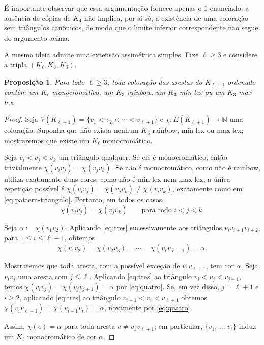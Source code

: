 \documentclass[reqno, 12pt]{amsart}
\numberwithin{equation}{section}
\theoremstyle{plain}
\newtheorem{proposition}[theorem]{Proposição}
\theoremstyle{definition}
\begin{document}
É importante observar que essa argumentação fornece apenas o
$1$-enunciado: a ausência de cópias de $K_4$ não implica, por si
só, a existência de uma coloração sem triângulos canônicos, de
modo que o limite inferior correspondente não segue do argumento
acima.

\medskip

A mesma ideia admite uma extensão assimétrica simples. Fixe
$\ell\geq3$ e considere a tripla $(K_\ell,K_3,K_3)$.

\begin{proposition}
  \label{prop:l33-complete}
  Para todo $\ell\geq3$, toda coloração das arestas do
  $K_{\ell+1}$ ordenado contém um $K_\ell$ monocromático, um
  $K_3$ rainbow, um $K_3$ min-lex ou um $K_3$ max-lex.
\end{proposition}

\begin{proof}
  Seja $V(K_{\ell+1})=\{v_1<v_2<\cdots<v_{\ell+1}\}$ e
  $\chi:E(K_{\ell+1})\to\mathbb{N}$ uma coloração. Suponha que não
  exista nenhum $K_3$ rainbow, min-lex ou max-lex; mostraremos que
  existe um $K_\ell$ monocromático.

  Seja $v_i<v_j<v_k$ um triângulo qualquer. Se ele é monocromático,
  então trivialmente $\chi(v_iv_j)=\chi(v_jv_k)$. Se não é
  monocromático, como não é rainbow, utiliza exatamente duas cores;
  como não é min-lex nem max-lex, a única repetição possível é
  $\chi(v_iv_j)=\chi(v_jv_k)\neq\chi(v_iv_k)$, exatamente como em
  \eqref{eq:pattern-triangulo}. Portanto, em todos os casos,
  \begin{equation}
    \label{eq:tres}
    \chi(v_iv_j)=\chi(v_jv_k)
    \qquad
    \text{para todo }i<j<k.
  \end{equation}

  Seja $\alpha:=\chi(v_1v_2)$. Aplicando \eqref{eq:tres}
  sucessivamente aos triângulos $v_iv_{i+1}v_{i+2}$, para
  $1\leq i\leq\ell-1$, obtemos
  \begin{equation}
    \label{eq:quatro}
    \chi(v_1v_2)=\chi(v_2v_3)=\cdots=\chi(v_\ell v_{\ell+1})=\alpha.
  \end{equation}

  Mostraremos que toda aresta, com a possível exceção de
  $v_1v_{\ell+1}$, tem cor $\alpha$. Seja $v_iv_j$ uma aresta com
  $j\leq\ell$. Aplicando \eqref{eq:tres} ao triângulo
  $v_i<v_j<v_{j+1}$, temos $\chi(v_iv_j)=\chi(v_jv_{j+1})=\alpha$
  por \eqref{eq:quatro}. Se, em vez disso, $j=\ell+1$ e $i\geq2$,
  aplicando \eqref{eq:tres} ao triângulo $v_{i-1}<v_i<v_{\ell+1}$
  obtemos $\chi(v_iv_{\ell+1})=\chi(v_{i-1}v_i)=\alpha$, novamente
  por \eqref{eq:quatro}.

  Assim, $\chi(e)=\alpha$ para toda aresta $e\neq v_1v_{\ell+1}$;
  em particular, $\{v_1,\ldots,v_\ell\}$ induz um $K_\ell$
  monocromático de cor $\alpha$.
\end{proof}
\end{document}
